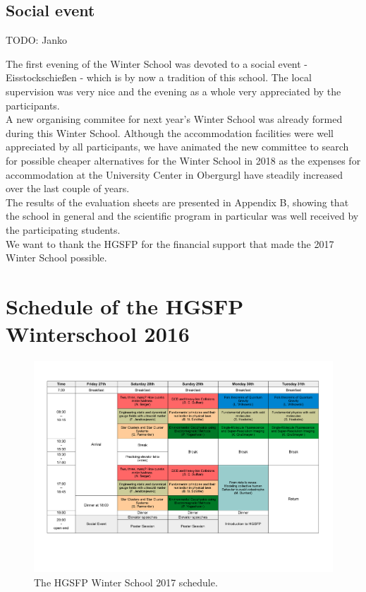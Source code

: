 \documentclass[11pt,a4paper]{article}
\numberwithin{equation}{section}
\numberwithin{table}{section}\setlength{\multlinegap}{25pt}
\begin{document}
\subsection*{Social event}

TODO: Janko

The first evening of the Winter School was devoted to a social event - Eisstockschie{\ss}en - which is by now a tradition of this school. The local supervision was very nice and the evening as a whole very appreciated by the participants.\\

A new organising commitee for next year's Winter School was already formed during this Winter School. Although the accommodation facilities were well appreciated by all participants, we have animated the new committee to search for possible cheaper alternatives for the Winter School in 2018 as the expenses for accommodation at the University Center in Obergurgl have steadily increased over the last couple of years.
\\
The results of the evaluation sheets are presented in Appendix B, showing that the school in general and the scientific program in particular was well received by the participating students.\\

\noindent We want to thank the HGSFP for the financial support that made the 2017 Winter School possible.


\newpage
\appendix
\section{Schedule of the HGSFP Winterschool 2016}

\begin{figure}[H]
\centering
\includegraphics[angle=90,width=0.999\textwidth]{FinalProgram.pdf}
\caption{The HGSFP Winter School 2017 schedule.}
\end{figure}
\newpage
\end{document}
